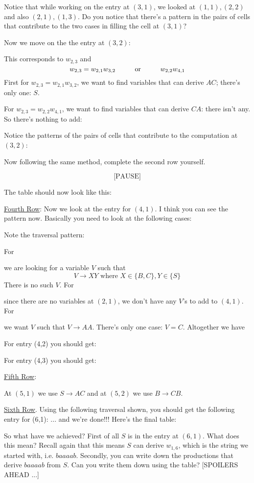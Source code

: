 Notice that while working on the entry at $(3,1)$, we looked at 
$(1,1),(2,2)$ and also $(2,1),(1,3)$.
Do you notice that there's a pattern in the pairs of cells that
contribute to the two cases in filling the cell at $(3,1)$?


Now we move on the the entry at $(3,2)$:


This corresponds to $w_{2,3}$ and
\[
w_{2,3} = w_{2,1}w_{3,2} \hskip 1cm \text{or} \hskip 1cm w_{2,2}w_{4,1}
\] 
First for $w_{2,3} = w_{2,1}w_{3,2}$, we want to find variables that can derive
$AC$; there's only one: $S$.


For $w_{2,3} = w_{2,2}w_{4,1}$, we want to find variables 
that can derive $CA$: there isn't any.
So there's nothing to add:


Notice the patterns of the pairs of cells that contribute to the 
computation at $(3,2)$:


Now following the same method, complete the second row yourself.

\[
  \text{[PAUSE]}
\]

\newpage
The table should now look like this:


\underline{Fourth Row}:
Now we look at the entry for $(4,1)$.
I think you can see the pattern now.
Basically you need to look at the following cases:

Note the traversal pattern:


For

we are looking for a variable $V$ such that
\[
  V \rightarrow XY \text{ where } X \in \{B,C\}, Y \in \{S\}
\]
There is no such $V$.
For

since there are no variables at $(2, 1)$, we don't have any $V$'s to add to $(4,1)$.
For

we want $V$ such that $V \rightarrow AA$. There's only one case: $V = C$.
Altogether we have


For entry (4,2) you should get:


For entry (4,3) you should get:


\underline{Fifth Row}:

At $(5, 1)$ we use $S \rightarrow AC$ and at $(5,2)$ we use $B \rightarrow CB$.

\underline{Sixth Row}.
Using the following traversal shown, you should get the following entry for (6,1):
... and we're done!!! Here's the final table:


So what have we achieved? First of all $S$ is in the entry at $(6,1)$.
What does this mean? 
Recall again that this means $S$ can derive $w_{1,6}$, which is the
string we started with, i.e. $baaaab$.
Secondly, you can write down the productions that derive $baaaab$ from $S$.
Can you write them down using the table? [SPOILERS AHEAD ...]

